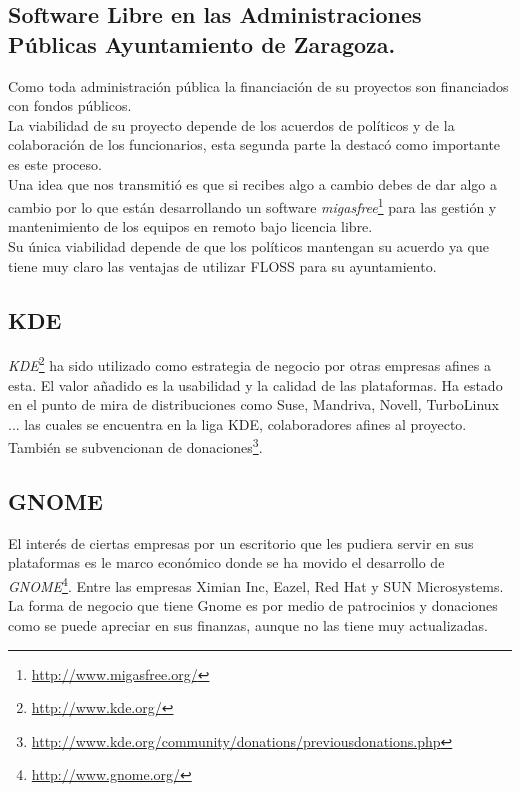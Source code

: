 \documentclass[12pt]{article} %
\begin{document}
\subsection{Software Libre en las Administraciones Públicas Ayuntamiento de Zaragoza.} %

Como toda administración pública la financiación de su proyectos son financiados con fondos públicos.\\La viabilidad de su proyecto depende de los acuerdos de políticos y de la colaboración de los funcionarios, esta segunda parte la destacó como importante es este proceso.\\Una idea que nos transmitió es que si recibes algo a cambio debes de dar algo a cambio por lo que están desarrollando un software \emph{migasfree}\footnote{\url{http://www.migasfree.org/}} para las gestión y mantenimiento de los equipos en remoto bajo licencia libre.\\Su única viabilidad depende de que los políticos mantengan su acuerdo ya que tiene muy claro las ventajas de utilizar FLOSS para su ayuntamiento. 

\subsection{KDE} %

\emph{KDE}\footnote{\url{http://www.kde.org/}} ha sido utilizado como estrategia de negocio por otras empresas afines a esta. El valor añadido es la usabilidad y la calidad de las plataformas. Ha estado en el punto de mira de distribuciones como Suse, Mandriva, Novell, TurboLinux ... las cuales se encuentra en la liga KDE, colaboradores afines al proyecto. \\También se subvencionan de donaciones\footnote{\url{http://www.kde.org/community/donations/previousdonations.php}}.

\subsection{GNOME} %

El interés de ciertas empresas por un escritorio que les pudiera servir en sus plataformas es le marco económico donde se ha movido el desarrollo de \emph{GNOME}\footnote{\url{http://www.gnome.org/}}. Entre las empresas Ximian Inc, Eazel, Red Hat y SUN Microsystems.\\ La forma de negocio que tiene Gnome es por medio de patrocinios y donaciones como se puede apreciar en sus finanzas, aunque no las tiene muy actualizadas.
\end{document}
